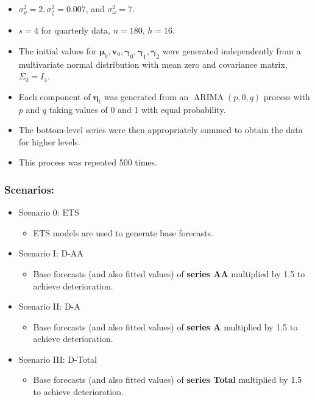 \documentclass[
  letterpaper,
  DIV=11,
  numbers=noendperiod]{scrartcl}
\providecommand{\tightlist}{%
  \setlength{\itemsep}{0pt}\setlength{\parskip}{0pt}}\usepackage{longtable,booktabs,array}
\begin{document}
\begin{itemize}
\tightlist
\item
  \(\sigma_{\varrho}^2=2, \sigma_\zeta^2=0.007\), and
  \(\sigma_\omega^2=7\).
\item
  \(s=4\) for quarterly data, \(n=180\), \(h=16\).
\item
  The initial values for
  \(\boldsymbol{\mu}_0, \boldsymbol{v}_0, \boldsymbol{\gamma}_0, \boldsymbol{\gamma}_1, \boldsymbol{\gamma}_2\)
  were generated independently from a multivariate normal distribution
  with mean zero and covariance matrix, \(\Sigma_0=I_4\).
\item
  Each component of \(\boldsymbol{\eta}_t\) was generated from an
  \(\operatorname{ARIMA}(p, 0, q)\) process with \(p\) and \(q\) taking
  values of 0 and 1 with equal probability.
\item
  The bottom-level series were then appropriately summed to obtain the
  data for higher levels.
\item
  This process was repeated 500 times.
\end{itemize}

\hypertarget{scenarios}{%
\subsubsection{Scenarios:}\label{scenarios}}

\begin{itemize}
\item
  Scenario 0: ETS

  \begin{itemize}
  \tightlist
  \item
    ETS models are used to generate base forecasts.
  \end{itemize}
\item
  Scenario I: D-AA

  \begin{itemize}
  \tightlist
  \item
    Base forecasts (and also fitted values) of \textbf{series AA}
    multiplied by 1.5 to achieve deterioration.
  \end{itemize}
\item
  Scenario II: D-A

  \begin{itemize}
  \tightlist
  \item
    Base forecasts (and also fitted values) of \textbf{series A}
    multiplied by 1.5 to achieve deterioration.
  \end{itemize}
\item
  Scenario III: D-Total

  \begin{itemize}
  \tightlist
  \item
    Base forecasts (and also fitted values) of \textbf{series Total}
    multiplied by 1.5 to achieve deterioration.
  \end{itemize}
\end{itemize}
\end{document}
